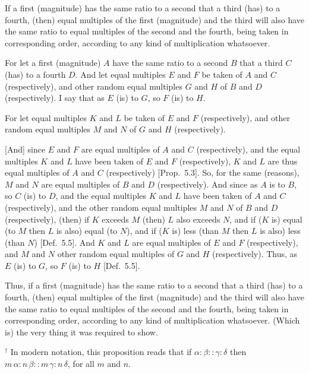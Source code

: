 \begin{Parallel}{}{}
{If  a first (magnitude) has the same ratio to a second 
that a third  (has) to a fourth, (then) equal multiples of the first (magnitude) and the third will also have the same ratio to equal multiples of the second and the fourth,  being taken in corresponding order, according to any kind of
multiplication whatsoever.

For let a first (magnitude) $A$ have the same ratio to a second $B$ that
a third $C$  (has) to a fourth $D$. And let equal multiples $E$ and $F$ 
be taken of $A$ and $C$ (respectively), and  other random equal multiples
$G$ and $H$  of $B$ and $D$ (respectively). I say that as $E$ (is)
to $G$, so $F$ (is) to $H$.

For let equal multiples $K$ and $L$ be taken of $E$ and $F$ (respectively),
and other random equal multiples $M$ and $N$ of $G$ and $H$ (respectively).

\mbox{[}And] since $E$ and $F$ are equal multiples of $A$ and $C$ (respectively), and
the equal multiples $K$ and $L$ have been taken of $E$ and $F$ (respectively),
 $K$ and $L$ are thus equal multiples of $A$ and $C$ (respectively) [Prop.~5.3]. So, for the same (reasons), $M$ and $N$
 are equal multiples of $B$ and $D$ (respectively). And since as $A$ is to
 $B$, so $C$ (is) to $D$, and the equal multiples $K$ and $L$ have been taken of $A$ and
 $C$ (respectively), and the other random equal multiples  $M$ and $N$ of $B$ and $D$ (respectively), (then) if $K$ exceeds $M$ (then) $L$ also
 exceeds $N$, and if ($K$ is) equal (to $M$ then $L$ is also) equal (to $N$), and if ($K$ is) less (than $M$ then $L$ is also) less (than $N$) [Def.~5.5]. And $K$ and $L$ are equal multiples of 
 $E$ and $F$ (respectively), and $M$ and $N$ other random equal multiples of $G$ and $H$ (respectively). Thus, as $E$ (is) to $G$, so $F$ (is) to $H$ 
 [Def.~5.5].

\epsfysize=3in
\centerline{}

Thus, if a first (magnitude) has the same ratio to a second 
that a third  (has) to a fourth, (then) equal multiples of the first (magnitude) and the third will also have the same ratio to equal multiples of the second and the fourth,  being taken in corresponding order, according to any kind of
multiplication whatsoever. (Which is) the very thing
it was required to show.}
\end{Parallel}
{\footnotesize \noindent$^\dag$ In modern notation, this
proposition reads that if $\alpha:\beta :: \gamma:\delta$ then
$m\,\alpha:n\,\beta::m\,\gamma:n\,\delta$, for all $m$ and $n$.}

